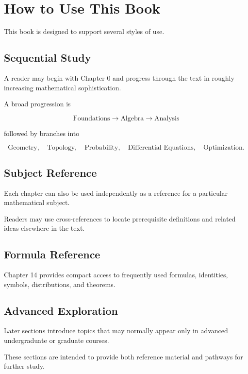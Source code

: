 \section*{How to Use This Book}

This book is designed to support several styles of use.

\subsection*{Sequential Study}

A reader may begin with Chapter 0 and progress through the text in roughly
increasing mathematical sophistication.

A broad progression is

\[
\boxed{
\text{Foundations}
\rightarrow
\text{Algebra}
\rightarrow
\text{Analysis}
}
\]

followed by branches into

\[
\boxed{
\text{Geometry},
\quad
\text{Topology},
\quad
\text{Probability},
\quad
\text{Differential Equations},
\quad
\text{Optimization}.
}
\]

\subsection*{Subject Reference}

Each chapter can also be used independently as a reference for a particular
mathematical subject.

Readers may use cross-references to locate prerequisite definitions and
related ideas elsewhere in the text.

\subsection*{Formula Reference}

Chapter 14 provides compact access to frequently used formulas, identities,
symbols, distributions, and theorems.

\subsection*{Advanced Exploration}

Later sections introduce topics that may normally appear only in advanced
undergraduate or graduate courses.

These sections are intended to provide both reference material and pathways
for further study.

